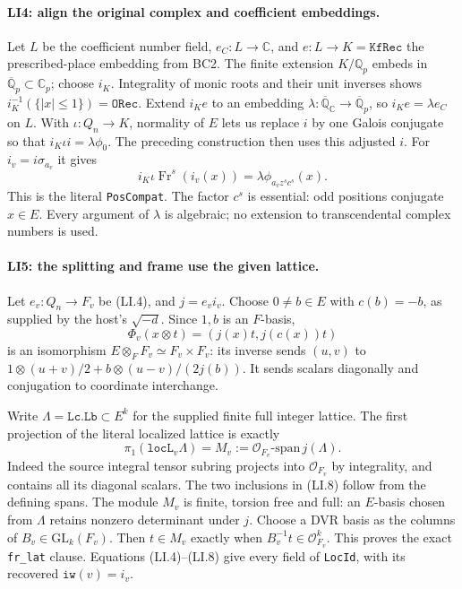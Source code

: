 \paragraph{LI4: align the original complex and coefficient embeddings.}
Let $L$ be the coefficient number field, $e_C:L\to\mathbb C$, and
$e:L\to K=\texttt{KfRec}$ the prescribed-place embedding from BC2.
The finite extension $K/\mathbb Q_p$ embeds in
$\overline{\mathbb Q}_p\subset\mathbb C_p$; choose $i_K$.
Integrality of monic roots and their unit inverses shows
$i_K^{-1}(\{|x|\le1\})=\texttt{ORec}$.
Extend $i_Ke$ to an embedding
$\lambda:\overline{\mathbb Q}_{\mathbb C}\to\overline{\mathbb Q}_p$,
so $i_K e=\lambda e_C$ on $L$.
With $\iota:Q_n\to K$, normality of $E$ lets us replace $i$ by
one Galois conjugate so that $i_K\iota i=\lambda\phi_0$.
The preceding construction then uses this adjusted $i$. For
$i_v=i\sigma_{a_v}$ it gives
\[
 i_K\iota\operatorname{Fr}^{s}(i_v(x))
   =\lambda\phi_{a_vz^sc^s}(x).                         \tag{LI.6}
\]
This is the literal \texttt{PosCompat}. The factor $c^s$ is essential:
odd positions conjugate $x\in E$. Every argument of $\lambda$ is
algebraic; no extension to transcendental complex numbers is used.

\paragraph{LI5: the splitting and frame use the given lattice.}
Let $e_v:Q_n\to F_v$ be (LI.4), and $j=e_vi_v$. Choose
$0\ne b\in E$ with $c(b)=-b$, as supplied by the host's
$\sqrt{-d}$. Since $1,b$ is an $F$-basis,
\[
 \Phi_v(x\otimes t)=(j(x)t,j(c(x))t)                    \tag{LI.7}
\]
is an isomorphism $E\otimes_FF_v\simeq F_v\times F_v$:
its inverse sends $(u,v)$ to
$1\otimes(u+v)/2+b\otimes(u-v)/(2j(b))$.
It sends scalars diagonally and conjugation to coordinate interchange.

Write $\Lambda=\texttt{Lc.Lb}\subset E^k$ for the supplied finite
full integer lattice. The first projection of the literal localized
lattice is exactly
\[
 \pi_1(\texttt{locL}_v\Lambda)
   =M_v:=\mathcal O_{F_v}\text{-span}\,j(\Lambda).        \tag{LI.8}
\]
Indeed the source integral tensor subring projects into
$\mathcal O_{F_v}$ by integrality, and contains all its diagonal
scalars. The two inclusions in (LI.8) follow from the defining spans.
The module $M_v$ is finite, torsion free and full: an $E$-basis chosen
from $\Lambda$ retains nonzero determinant under $j$.
Choose a DVR basis as the columns of $B_v\in\mathrm{GL}_k(F_v)$.
Then $t\in M_v$ exactly when $B_v^{-1}t\in\mathcal O_{F_v}^k$.
This proves the exact \texttt{fr\_lat} clause. Equations (LI.4)--(LI.8)
give every field of \texttt{LocId}, with its recovered
$\texttt{iw}(v)=i_v$.

